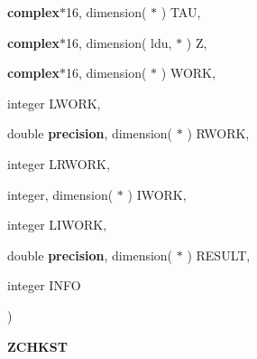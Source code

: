 {\begin{DoxyParamCaption}
\item[{{\bf complex}$\ast$16, dimension( $\ast$ )}]{T\+A\+U, }
\item[{{\bf complex}$\ast$16, dimension( ldu, $\ast$ )}]{Z, }
\item[{{\bf complex}$\ast$16, dimension( $\ast$ )}]{W\+O\+R\+K, }
\item[{integer}]{L\+W\+O\+R\+K, }
\item[{double {\bf precision}, dimension( $\ast$ )}]{R\+W\+O\+R\+K, }
\item[{integer}]{L\+R\+W\+O\+R\+K, }
\item[{integer, dimension( $\ast$ )}]{I\+W\+O\+R\+K, }
\item[{integer}]{L\+I\+W\+O\+R\+K, }
\item[{double {\bf precision}, dimension( $\ast$ )}]{R\+E\+S\+U\+L\+T, }
\item[{integer}]{I\+N\+F\+O}
\end{DoxyParamCaption}
)}\label{group__complex16__eig_ga23b67e5ea0fd86a8df3a60703acabef0}


{\bfseries Z\+C\+H\+K\+S\+T} 

